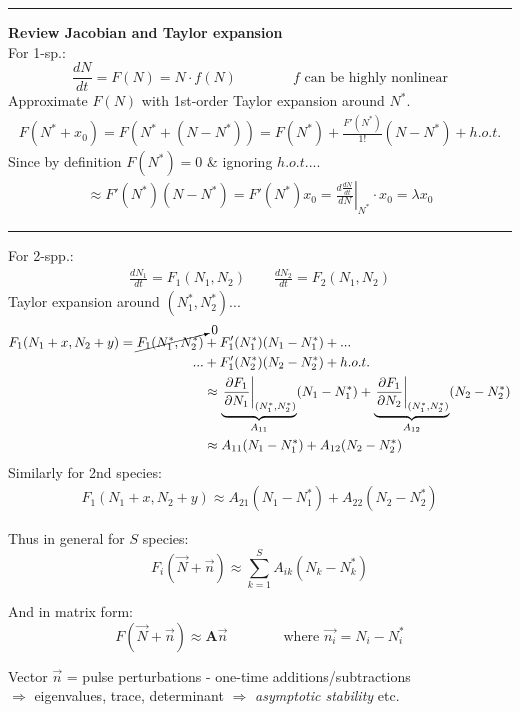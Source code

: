 \documentclass{article}
\newcommand{\ind}{\-\hspace{1cm}}
\begin{document}
\rule[0.5ex]{\linewidth}{1pt}
\textbf{Review Jacobian and Taylor expansion}\\
For 1-sp.:
\begin{equation*}
	\frac{dN}{dt}=F(N)=N\cdot f(N) \qquad \qquad f \text{ can be highly nonlinear}
\end{equation*}
\ind Approximate $F(N)$ with 1st-order Taylor expansion around $N^*$.
\begin{align*}
	F(N^*+x_0)=F(N^*+(N-N^*))=F(N^*) + \frac{F'(N^*)}{1!}(N-N^*)+ h.o.t.
\end{align*}
\ind Since by definition $F(N^*)=0$ \& ignoring $h.o.t.$...
\begin{align*}
 \approx F'(N^*)(N-N^*) = F'(N^*)x_0 = \left.\frac{d\tfrac{dN}{dt}}{dN}\right\vert_{N^*} \cdot x_0 = \lambda x_0
\end{align*}

\rule[0.5ex]{\linewidth}{1pt}

For 2-spp.:
\begin{align*}
	\frac{dN_1}{dt}=F_1(N_1,N_2) \qquad \frac{dN_2}{dt}=F_2(N_1,N_2)
\end{align*}
\ind Taylor expansion around $(N_1^*, N_2^*)$...
\begin{align*}
	F_1(N_1+x,N_2+y)=\cancelto{0}{F_1(N_1^*,N_2^*)} & + F_1'(N_1^*)(N_1-N_1^*) +... \\
	... & + F_1'(N_2^*)(N_2-N_2^*) + h.o.t.\\
	& \approx \underbrace{\left.\frac{\partial F_1}{\partial N_1}\right\vert_{(N_1^*,N_2^*)}}_{A_{11}}(N_1-N_1^*) + \underbrace{\left.\frac{\partial F_1}{\partial N_2}\right\vert_{(N_1^*,N_2^*)}}_{A_{12}}(N_2-N_2^*)\\
	& \approx A_{11}(N_1-N_1^*) + A_{12}(N_2-N_2^*)
\end{align*}
Similarly for 2nd species:
\begin{align*}
F_1(N_1+x,N_2+y)  \approx A_{21}(N_1-N_1^*) + A_{22}(N_2-N_2^*)
\end{align*}

Thus in general for $S$ species:
\begin{equation*}
	F_i(\vec{N} + \vec{n}) \approx \sum_{k=1}^S A_{ik}(N_k-N_k^*)
\end{equation*}

And in matrix form:
\begin{equation*}
	F(\vec{N}+\vec{n}) \approx \mathbf{A} \vec{n} \qquad \qquad \text{where } \vec{n_i}=N_i-N_i^*
\end{equation*}

Vector $\vec{n}$ = pulse perturbations - one-time additions/subtractions\\
\ind $\Rightarrow$ eigenvalues, trace, determinant $\Rightarrow$ \emph{asymptotic stability} etc.
\end{document}
